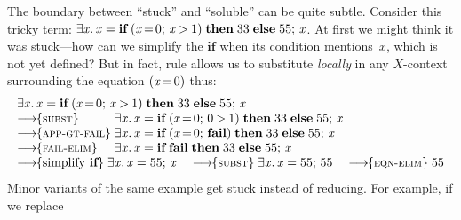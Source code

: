 \documentclass[acmsmall]{acmart}
\newcommand{\Varid}[1]{\mathit{#1}}
\begin{document}
The boundary between ``stuck'' and ``soluble'' can be quite subtle.
Consider this tricky term:
\ensuremath{\exists\Varid{x}.\,\Varid{x}\mathrel{=}\textbf{if}\;(\Varid{x}\hspace{-0.14em}=\hspace{-0.14em}\mathrm{0};\,\Varid{x}\mathbin{>}\mathrm{1})\;\textbf{then}\;\mathrm{33}\;\textbf{else}\;\mathrm{55};\,\Varid{x}}.
At first we might think it was stuck---how can we simplify the \ensuremath{\textbf{if}}
when its condition mentions~\ensuremath{\Varid{x}}, which is not yet defined?  But in fact, rule  allows
us to substitute \emph{locally} in any \ensuremath{X}-context surrounding the equation \ensuremath{(\Varid{x}\hspace{-0.14em}=\hspace{-0.14em}\mathrm{0})}
thus:
$$
\begin{array}{l@{\;}l}
\multicolumn{2}{l}{\ensuremath{\exists\Varid{x}.\,\Varid{x}\mathrel{=}\textbf{if}\;(\Varid{x}\hspace{-0.14em}=\hspace{-0.14em}\mathrm{0};\,\Varid{x}\mathbin{>}\mathrm{1})\;\textbf{then}\;\mathrm{33}\;\textbf{else}\;\mathrm{55};\,\Varid{x}}} \\
\movestoR{subst}                & \ensuremath{\exists\Varid{x}.\,\Varid{x}\mathrel{=}\textbf{if}\;(\Varid{x}\hspace{-0.14em}=\hspace{-0.14em}\mathrm{0};\,\mathrm{0}\mathbin{>}\mathrm{1})\;\textbf{then}\;\mathrm{33}\;\textbf{else}\;\mathrm{55};\,\Varid{x}} \\
\movestoR{app-gt-fail}     & \ensuremath{\exists\Varid{x}.\,\Varid{x}\mathrel{=}\textbf{if}\;(\Varid{x}\hspace{-0.14em}=\hspace{-0.14em}\mathrm{0};\,\textbf{fail})\;\textbf{then}\;\mathrm{33}\;\textbf{else}\;\mathrm{55};\,\Varid{x}} \\
\movestoR{fail-elim}     & \ensuremath{\exists\Varid{x}.\,\Varid{x}\mathrel{=}\textbf{if}\;\textbf{fail}\;\textbf{then}\;\mathrm{33}\;\textbf{else}\;\mathrm{55};\,\Varid{x}} \\
\multicolumn{2}{l}{\movestoC{\text{simplify \ensuremath{\textbf{if}}}} \; \ensuremath{\exists\Varid{x}.\,\Varid{x}\mathrel{=}\mathrm{55};\,\Varid{x}} \quad
\movestoR{subst} \; \ensuremath{\exists\Varid{x}.\,\Varid{x}\mathrel{=}\mathrm{55};\,\mathrm{55}} \quad
\movestoR{eqn-elim}  \; \ensuremath{\mathrm{55}}}
\end{array}
$$
Minor variants of the same example get stuck instead of reducing. For example, if we replace
\end{document}
